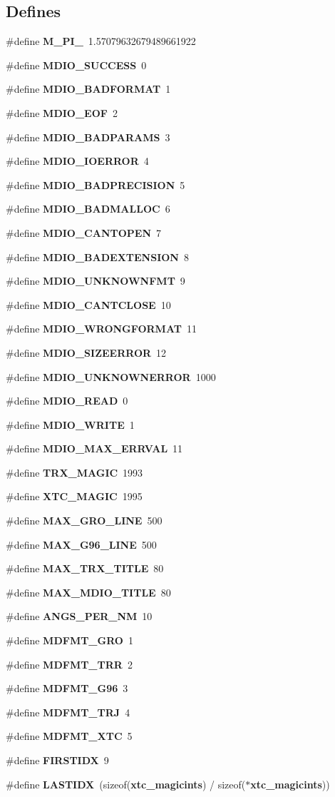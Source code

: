 \subsection*{Defines}
\begin{CompactItemize}
\item 
\#define {\bf M\_\-PI\_}\ 1.57079632679489661922
\item 
\#define {\bf MDIO\_\-SUCCESS}\ 0
\item 
\#define {\bf MDIO\_\-BADFORMAT}\ 1
\item 
\#define {\bf MDIO\_\-EOF}\ 2
\item 
\#define {\bf MDIO\_\-BADPARAMS}\ 3
\item 
\#define {\bf MDIO\_\-IOERROR}\ 4
\item 
\#define {\bf MDIO\_\-BADPRECISION}\ 5
\item 
\#define {\bf MDIO\_\-BADMALLOC}\ 6
\item 
\#define {\bf MDIO\_\-CANTOPEN}\ 7
\item 
\#define {\bf MDIO\_\-BADEXTENSION}\ 8
\item 
\#define {\bf MDIO\_\-UNKNOWNFMT}\ 9
\item 
\#define {\bf MDIO\_\-CANTCLOSE}\ 10
\item 
\#define {\bf MDIO\_\-WRONGFORMAT}\ 11
\item 
\#define {\bf MDIO\_\-SIZEERROR}\ 12
\item 
\#define {\bf MDIO\_\-UNKNOWNERROR}\ 1000
\item 
\#define {\bf MDIO\_\-READ}\ 0
\item 
\#define {\bf MDIO\_\-WRITE}\ 1
\item 
\#define {\bf MDIO\_\-MAX\_\-ERRVAL}\ 11
\item 
\#define {\bf TRX\_\-MAGIC}\ 1993
\item 
\#define {\bf XTC\_\-MAGIC}\ 1995
\item 
\#define {\bf MAX\_\-GRO\_\-LINE}\ 500
\item 
\#define {\bf MAX\_\-G96\_\-LINE}\ 500
\item 
\#define {\bf MAX\_\-TRX\_\-TITLE}\ 80
\item 
\#define {\bf MAX\_\-MDIO\_\-TITLE}\ 80
\item 
\#define {\bf ANGS\_\-PER\_\-NM}\ 10
\item 
\#define {\bf MDFMT\_\-GRO}\ 1
\item 
\#define {\bf MDFMT\_\-TRR}\ 2
\item 
\#define {\bf MDFMT\_\-G96}\ 3
\item 
\#define {\bf MDFMT\_\-TRJ}\ 4
\item 
\#define {\bf MDFMT\_\-XTC}\ 5
\item 
\#define {\bf FIRSTIDX}\ 9
\item 
\#define {\bf LASTIDX}\ (sizeof({\bf xtc\_\-magicints}) / sizeof($\ast${\bf xtc\_\-magicints}))
\end{CompactItemize}
